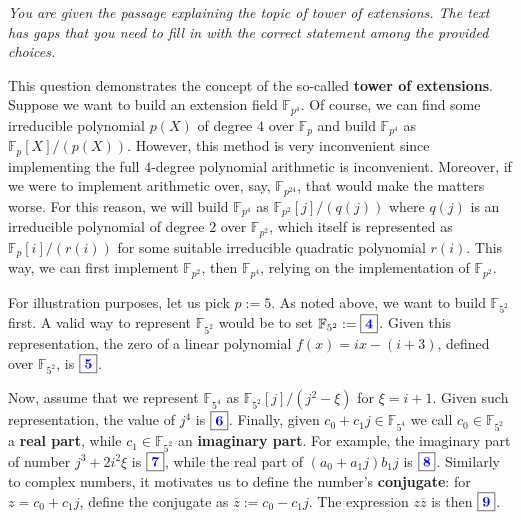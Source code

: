 \documentclass[../lecture-notes-148x210.tex]{subfiles}
\begin{document}
\begin{tcolorbox}[breakable, colback=blue!5!white,fonttitle=\bfseries,colframe=blue!80!white,title=Exercises 4-9. Tower of Extensions]
    \textit{You are given the passage explaining the topic of tower of extensions. The text has gaps that you need to fill in with the correct statement among the provided choices.}
    \vspace{5px}
    
    This question demonstrates the concept of the so-called \textbf{tower of extensions}. Suppose we want to build an extension field $\mathbb{F}_{p^4}$. Of course, we can find some irreducible polynomial $p(X)$ of degree $4$ over $\mathbb{F}_p$ and build $\mathbb{F}_{p^4}$ as $\mathbb{F}_p[X]/(p(X))$. However, this method is very inconvenient since implementing the full $4$-degree polynomial arithmetic is inconvenient. Moreover, if we were to implement arithmetic over, say, $\mathbb{F}_{p^{24}}$, that would make the matters worse. For this reason, we will build $\mathbb{F}_{p^4}$ as $\mathbb{F}_{p^2}[j]/(q(j))$ where $q(j)$ is an irreducible polynomial of degree $2$ over $\mathbb{F}_{p^2}$, which itself is represented as $\mathbb{F}_p[i]/(r(i))$ for some suitable irreducible quadratic polynomial $r(i)$. This way, we can first implement $\mathbb{F}_{p^2}$, then $\mathbb{F}_{p^4}$, relying on the implementation of $\mathbb{F}_{p^2}$.
    \vspace{5px}

    For illustration purposes, let us pick $p:=5$. As noted above, we want to build $\mathbb{F}_{5^2}$ first. A valid way to represent $\mathbb{F}_{5^2}$ would be to set $\mathbb{F}_{5^2} := \boxed{\textcolor{blue}{\textbf{4}}}$. Given this representation, the zero of a linear polynomial $f(x) = ix - (i+3)$, defined over $\mathbb{F}_{5^2}$, is $\boxed{\textcolor{blue}{\textbf{5}}}$.
    \vspace{5px}

    Now, assume that we represent $\mathbb{F}_{5^4}$ as $\mathbb{F}_{5^2}[j]/(j^2-\xi)$ for $\xi = i+1$. Given such representation, the value of $j^4$ is $\boxed{\textcolor{blue}{\textbf{6}}}$. Finally, given $c_0+c_1j \in \mathbb{F}_{5^4}$ we call $c_0 \in \mathbb{F}_{5^2}$ a \textbf{real part}, while $c_1 \in \mathbb{F}_{5^2}$ an \textbf{imaginary part}. For example, the imaginary part of number $j^3+2i^2\xi$ is $\boxed{\textcolor{blue}{\textbf{7}}}$, while the real part of $(a_0+a_1j)b_1j$ is $\boxed{\textcolor{blue}{\textbf{8}}}$. Similarly to complex numbers, it motivates us to define the number's \textbf{conjugate}: for $z = c_0+c_1j$, define the conjugate as $\overline{z} := c_0-c_1j$. The expression $z\overline{z}$ is then $\boxed{\textcolor{blue}{\textbf{9}}}$.
\end{tcolorbox}
\end{document}

